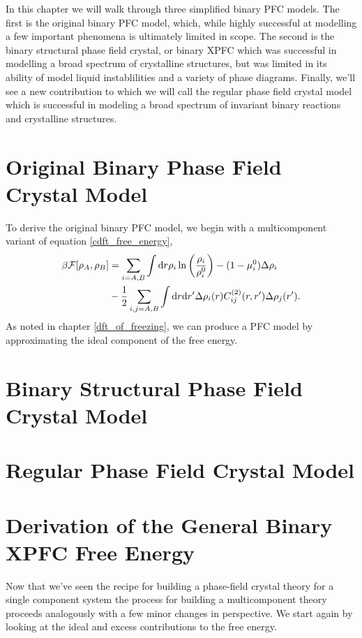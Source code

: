 In this chapter we will walk through three simplified binary PFC models. The
first is the original binary PFC model, which, while highly successful at
modelling a few important phenomena is ultimately limited in scope. The second
is the binary structural phase field crystal, or binary XPFC which was
successful in modelling a broad spectrum of crystalline structures, but was
limited in its ability of model liquid instablilities and a variety of phase
diagrams. Finally, we'll see a new contribution to which we will call the
regular phase field crystal model which is successful in modeling a broad
spectrum of invariant binary reactions and crystalline structures. 

\section{Original Binary Phase Field Crystal Model}

To derive the original binary PFC model, we begin with a multicomponent variant of
equation \ref{cdft_free_energy}, 
%
\begin{align}
    \beta\mathcal{F}[\rho_A, \rho_B] &= \sum_{i=A, B} \int \mathrm{d}r \rho_i \ln\left(\frac{\rho_i}{\rho_i^0}\right) 
            - (1 - \mu_i^0) \Delta\rho_i \\
        &- \frac{1}{2} \sum_{i,j=A, B} \int \mathrm{d}r \mathrm{d}r^\prime \Delta\rho_i(r) 
            C^{(2)}_{ij}(r, r^\prime) \Delta\rho_j(r^\prime).
\end{align}
%
As noted in chapter \ref{dft_of_freezing}, we can produce a PFC model by approximating
the ideal component of the free energy. 

\section{Binary Structural Phase Field Crystal Model}

\section{Regular Phase Field Crystal Model}

\section*{Derivation of the General Binary XPFC Free Energy}

Now that we've seen the recipe for building a phase-field crystal theory for a
single component system the process for building a multicomponent theory
proceeds analogously with a few minor changes in perspective.  We start again
by looking at the ideal and excess contributions to the free energy.

